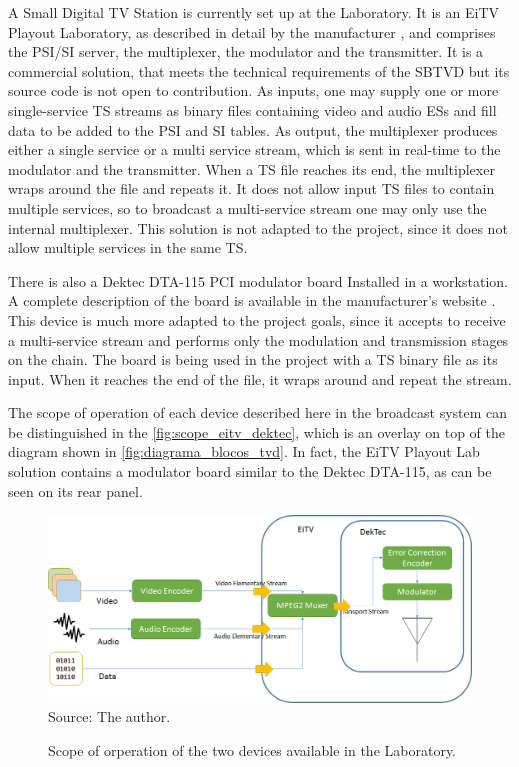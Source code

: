 \documentclass[
	12pt,				%
	openright,			%
	twoside,			%
	a4paper,			%
	brazil,
	french,				%
	english
	]{abntex2}
\begin{document}
A Small Digital TV Station is currently set up at the Laboratory. It is an EiTV Playout Laboratory, as described in detail by the manufacturer \cite{eitv}, and comprises the PSI/SI server, the multiplexer, the modulator and the transmitter. It is a commercial solution, that meets the technical requirements of the SBTVD but its source code is not open to contribution. As inputs, one may supply one or more single-service TS streams as binary files containing video and audio ESs and fill data to be added to the PSI and SI tables. As output, the multiplexer produces either a single service or a multi service stream, which is sent in real-time to the modulator and the transmitter. When a TS file reaches its end, the multiplexer wraps around the file and repeats it. It does not allow input TS files to contain multiple services, so to broadcast a multi-service stream one may only use the internal multiplexer. This solution is not adapted to the project, since it does not allow multiple services in the same TS.

There is also a Dektec DTA-115 PCI modulator board Installed in a workstation. A complete description of the board is available in the manufacturer's website \cite{dektec}. This device is much more adapted to the project goals, since it accepts to receive a multi-service stream and performs only the modulation and transmission stages on the chain. The board is being used in the project with a TS binary file as its input. When it reaches the end of the file, it wraps around and repeat the stream.

The scope of operation of each device described here in the broadcast system can be distinguished in the \autoref{fig:scope_eitv_dektec}, which is an overlay on top of the diagram shown in \autoref{fig:diagrama_blocos_tvd}. In fact, the EiTV Playout Lab solution contains a modulator board similar to the Dektec DTA-115, as can be seen on its rear panel.

\begin{figure}[!hb]
\centering
\caption{Scope of orperation of the two devices available in the Laboratory.}
\includegraphics[width=1\linewidth]{figuras/scope_eitv_dektec.png}
\\Source: The author.
\label{fig:scope_eitv_dektec}
\end{figure}
\end{document}
